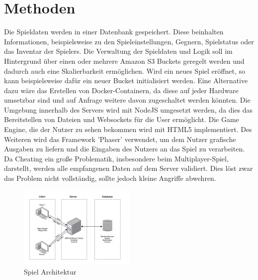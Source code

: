 \documentclass[conference]{IEEEtran}
\begin{document}
\section{Methoden}
Die Spieldaten werden in einer Datenbank gespeichert. Diese beinhalten Informationen, beispielsweise zu den Spieleinstellungen, Gegnern, Spielstatus oder das Inventar der Spielers. 
Die Verwaltung der Spieldaten und Logik soll im Hintergrund über einen oder mehrere Amazon S3 Buckets geregelt werden und dadurch auch eine Skalierbarkeit ermöglichen. Wird ein neues Spiel eröffnet, so kann beispielsweise dafür ein neuer Bucket initialisiert werden. Eine Alternative dazu wäre das Erstellen von Docker-Containern, da diese auf jeder Hardware umsetzbar sind und auf Anfrage weitere davon zugeschaltet werden könnten. Die Umgebung innerhalb des Servers wird mit NodeJS umgesetzt werden, da dies das Bereitstellen von Dateien und Websockets für die User ermöglicht. 
Die Game Engine, die der Nutzer zu sehen bekommen wird mit HTML5 implementiert. Des Weiteren wird das Framework 'Phaser' verwendet, um dem Nutzer grafische Ausgaben zu liefern und die Eingaben des Nutzers an das Spiel zu verarbeiten.
Da Cheating ein große Problematik, insbesondere beim Multiplayer-Spiel, darstellt, werden alle empfangenen Daten auf dem Server validiert. Dies löst zwar das Problem nicht vollständig, sollte jedoch kleine Angriffe abwehren. 
\begin{figure}[H]
    \centering
    \includegraphics[width=0.5\textwidth]{res/game_arch.png}
    \caption{Spiel Architektur}
\end{figure}
\end{document}
